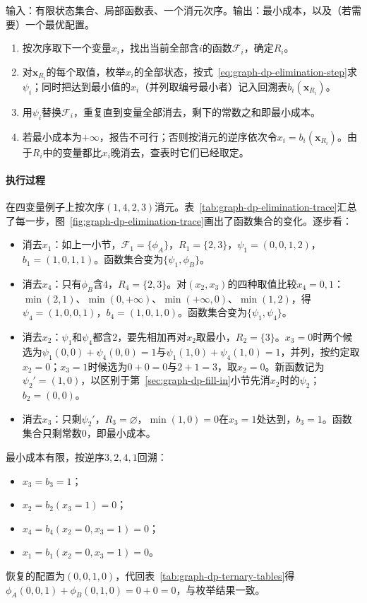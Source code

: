 \begin{algorithm}[变量消元求最小成本]
\label{alg:graph-dp-variable-elimination}
输入：有限状态集合、局部函数表、一个消元次序。输出：最小成本，以及（若需要）一个最优配置。
\begin{enumerate}
  \item 按次序取下一个变量$x_i$，找出当前全部含$i$的函数$\mathcal F_i$，确定$R_i$。
  \item 对$\bm x_{R_i}$的每个取值，枚举$x_i$的全部状态，按式~\eqref{eq:graph-dp-elimination-step}求$\psi_i$；同时把达到最小值的$x_i$（并列取编号最小者）记入回溯表$b_i(\bm x_{R_i})$。
  \item 用$\psi_i$替换$\mathcal F_i$，重复直到变量全部消去，剩下的常数之和即最小成本。
  \item 若最小成本为$+\infty$，报告不可行；否则按消元的逆序依次令$x_i=b_i(\bm x_{R_i})$。由于$R_i$中的变量都比$x_i$晚消去，查表时它们已经取定。
\end{enumerate}
\end{algorithm}

\paragraph{执行过程}
在四变量例子上按次序$(1,4,2,3)$消元。表~\ref{tab:graph-dp-elimination-trace}汇总了每一步，图~\ref{fig:graph-dp-elimination-trace}画出了函数集合的变化。逐步看：
\begin{itemize}
  \item 消去$x_1$：如上一小节，$\mathcal F_1=\{\phi_A\}$，$R_1=\{2,3\}$，$\psi_1=(0,0,1,2)$，$b_1=(1,0,1,1)$。函数集合变为$\{\psi_1,\phi_B\}$。
  \item 消去$x_4$：只有$\phi_B$含$4$，$R_4=\{2,3\}$。对$(x_2,x_3)$的四种取值比较$x_4=0,1$：$\min(2,1)$、$\min(0,+\infty)$、$\min(+\infty,0)$、$\min(1,2)$，得$\psi_4=(1,0,0,1)$，$b_4=(1,0,1,0)$。函数集合变为$\{\psi_1,\psi_4\}$。
  \item 消去$x_2$：$\psi_1$和$\psi_4$都含$2$，要先相加再对$x_2$取最小，$R_2=\{3\}$。$x_3=0$时两个候选为$\psi_1(0,0)+\psi_4(0,0)=1$与$\psi_1(1,0)+\psi_4(1,0)=1$，并列，按约定取$x_2=0$；$x_3=1$时候选为$0+0=0$与$2+1=3$，取$x_2=0$。新函数记为$\psi_2'=(1,0)$，以区别于第~\ref{sec:graph-dp-fill-in}小节先消$x_2$时的$\psi_2$；$b_2=(0,0)$。
  \item 消去$x_3$：只剩$\psi_2'$，$R_3=\varnothing$，$\min(1,0)=0$在$x_3=1$处达到，$b_3=1$。函数集合只剩常数$0$，即最小成本。
\end{itemize}
最小成本有限，按逆序$3,2,4,1$回溯：
\begin{itemize}
  \item $x_3=b_3=1$；
  \item $x_2=b_2(x_3{=}1)=0$；
  \item $x_4=b_4(x_2{=}0,x_3{=}1)=0$；
  \item $x_1=b_1(x_2{=}0,x_3{=}1)=0$。
\end{itemize}
恢复的配置为$(0,0,1,0)$，代回表~\ref{tab:graph-dp-ternary-tables}得$\phi_A(0,0,1)+\phi_B(0,1,0)=0+0=0$，与枚举结果一致。

